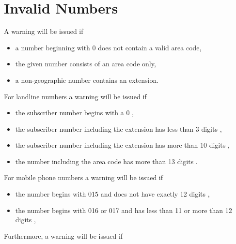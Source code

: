 \documentclass[numbers=noenddot]{scrreprt}
\newcommand{\UeberschriftUngueltig}{\section{Invalid Numbers}}
\newcommand{\WarnungWenn}{A warning will be issued if}
\begin{document}
\UeberschriftUngueltig
\WarnungWenn
\begin{itemize}
\item a number beginning with 0 does not contain a valid area code,
\item the given number consists of an area code only,
\item a non-geographic number contains an extension.
\end{itemize}
For landline numbers a warning will be issued if
\begin{itemize}
\item the subscriber number begins with a 0 \cite[6]{BNA-nummernplan},
\item the subscriber number including the extension has less than 3 digits \cite[6]{BNA-nummernplan},
\item the subscriber number including the extension has more than 10 digits \cite[3]{BNA-Struktur},
\item the number including the area code has more than 13 digits \cite[3]{BNA-Struktur}.
\end{itemize}
For mobile phone numbers a warning will be issued if
\begin{itemize}
\item the number begins with 015 and does not have exactly 12 digits \cite[49\psq]{BNA-konzept},
\item the number begins with 016 or 017 and has less than 11 or more than 12 digits \cite[50]{BNA-konzept},
\end{itemize}
Furthermore, a warning will be issued if
\end{document}
